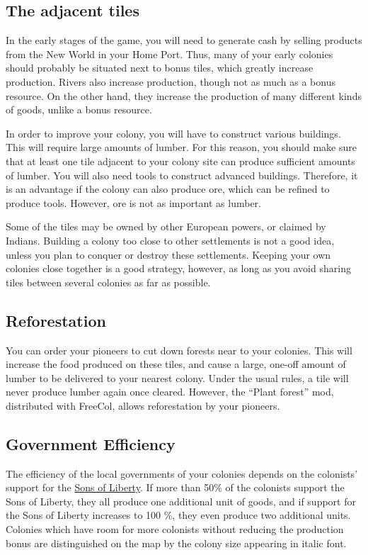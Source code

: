 \documentclass[12pt]{book}
\begin{document}
\hypertarget{The adjacent tiles}{\subsection{The adjacent tiles}}

In the early stages of the game, you will need to generate cash by
selling products from the New World in your Home Port. Thus, many of
your early colonies should probably be situated next to bonus tiles,
which greatly increase production. Rivers also increase production,
though not as much as a bonus resource. On the other hand, they
increase the production of many different kinds of goods, unlike a
bonus resource.

In order to improve your colony, you will have to construct various
buildings. This will require large amounts of lumber. For this reason,
you should make sure that at least one tile adjacent to your colony
site can produce sufficient amounts of lumber. You will also need
tools to construct advanced buildings. Therefore, it is an advantage
if the colony can also produce ore, which can be refined to produce
tools. However, ore is not as important as lumber.

Some of the tiles may be owned by other European powers, or claimed by
Indians. Building a colony too close to other settlements is not a
good idea, unless you plan to conquer or destroy these settlements.
Keeping your own colonies close together is a good strategy, however,
as long as you avoid sharing tiles between several colonies as far as
possible.


\hypertarget{Reforestation}{\subsection{Reforestation}}

You can order your pioneers to cut down forests near to your colonies.
This will increase the food produced on these tiles, and cause a
large, one-off amount of lumber to be delivered to your nearest colony.
Under the usual rules, a tile will never produce lumber again once
cleared. However, the ``Plant forest'' mod, distributed with FreeCol,
allows reforestation by your pioneers.


\hypertarget{Government Efficiency}{\subsection{Government Efficiency}}

The efficiency of the local governments of your colonies depends on
the colonists' support for the \hyperlink{Sons of Liberty}{Sons of
  Liberty}. If more than 50\% of the colonists support the Sons of
Liberty, they all produce one additional unit of goods, and if support
for the Sons of Liberty increases to 100 \%, they even produce two
additional units. Colonies which have room for more colonists without
reducing the production bonus are distinguished on the map by the
colony size appearing in italic font.
\end{document}
